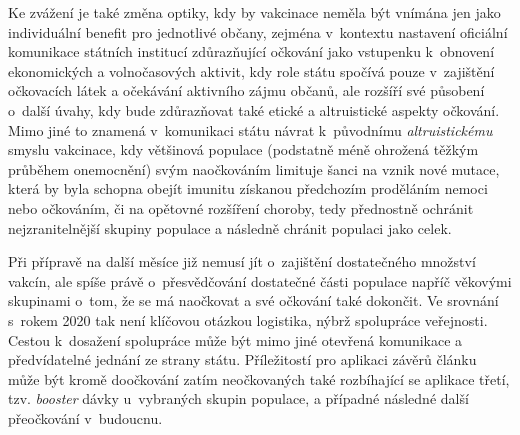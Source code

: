 Ke zvážení je také změna optiky, kdy by vakcinace neměla být vnímána jen jako individuální benefit pro jednotlivé občany, zejména v~kontextu nastavení oficiální komunikace státních institucí zdůrazňující očkování jako vstupenku k~obnovení ekonomických a volnočasových aktivit, kdy role státu spočívá pouze v~zajištění očkovacích látek a očekávání aktivního zájmu občanů, ale rozšíří své působení o~další úvahy, kdy bude zdůrazňovat také etické a altruistické aspekty očkování. %
Mimo jiné to znamená v~komunikaci státu návrat k~původnímu \emph{altruistickému} smyslu vakcinace, kdy většinová populace (podstatně méně ohrožená těžkým průběhem onemocnění) svým naočkováním limituje šanci na vznik nové mutace, která by byla schopna obejít imunitu získanou předchozím proděláním nemoci nebo očkováním, či na opětovné rozšíření choroby, tedy přednostně ochránit nejzranitelnější skupiny populace a následně chránit populaci jako celek. 


Při přípravě na další měsíce již nemusí jít o~zajištění dostatečného množství vakcín, ale spíše právě o~přesvědčování dostatečné části populace napříč věkovými skupinami o~tom, že se má naočkovat a své očkování také dokončit. Ve srovnání s~rokem 2020 tak není klíčovou otázkou logistika, nýbrž spolupráce veřejnosti. Cestou k~dosažení spolupráce může být mimo jiné otevřená komunikace a předvídatelné jednání ze strany státu. Příležitostí pro aplikaci závěrů článku může být kromě doočkování zatím neočkovaných také rozbíhající se aplikace třetí, tzv. \emph{booster} dávky u~vybraných skupin populace, a případné následné další přeočkování v~budoucnu. 







